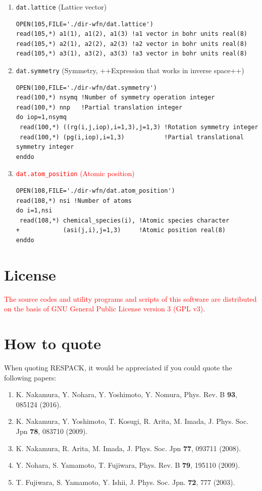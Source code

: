 \documentclass{article}
\newcommand{\tr}[1]{\textcolor{red}{#1}}
\begin{document}
\begin{enumerate}
\begin{verbatim}
\end{verbatim}
\item \verb+dat.lattice+ (Lattice vector)
\begin{verbatim}
OPEN(105,FILE='./dir-wfn/dat.lattice') 
read(105,*) a1(1), a1(2), a1(3) !a1 vector in bohr units real(8)
read(105,*) a2(1), a2(2), a2(3) !a2 vector in bohr units real(8) 
read(105,*) a3(1), a3(2), a3(3) !a3 vector in bohr units real(8) 
\end{verbatim}
\item \verb+dat.symmetry+ (Symmetry, ++Expression that works in inverse space++)
\begin{verbatim}
OPEN(100,FILE='./dir-wfn/dat.symmetry') 
read(100,*) nsymq !Number of symmetry operation integer
read(100,*) nnp   !Partial translation integer
do iop=1,nsymq 
 read(100,*) ((rg(i,j,iop),i=1,3),j=1,3) !Rotation symmetry integer
 read(100,*) (pg(i,iop),i=1,3)           !Partial translational symmetry integer 
enddo 
\end{verbatim}
\item \tr{{\tt dat.atom\_position} (Atomic position)}
\begin{verbatim}
OPEN(108,FILE='./dir-wfn/dat.atom_position')
read(108,*) nsi !Number of atoms
do i=1,nsi
 read(108,*) chemical_species(i), !Atomic species character
+            (asi(j,i),j=1,3)     !Atomic position real(8)
enddo
\end{verbatim}
\end{enumerate}

\clearpage 

\section{\label{license}License} 

\tr{The source codes and utility programs and scripts of this software are distributed on the basis of GNU General Public License version 3 (GPL v3)}.

\section{\label{howtocite}How to quote} 

When quoting RESPACK, it would be appreciated if you could quote the following papers: 
\begin{enumerate} 
\item K. Nakamura, Y. Nohara, Y. Yoshimoto, Y. Nomura, Phys. Rev. B {\bf 93}, 085124 (2016).
\item K. Nakamura, Y. Yoshimoto, T. Kosugi, R. Arita, M. Imada, J. Phys. Soc. Jpn {\bf 78}, 083710 (2009).
\item K. Nakamura, R. Arita, M. Imada, J. Phys. Soc. Jpn {\bf 77}, 093711 (2008).
\item Y. Nohara, S. Yamamoto, T. Fujiwara, Phys. Rev. B {\bf 79}, 195110 (2009).
\item T. Fujiwara, S. Yamamoto, Y. Ishii, J. Phys. Soc. Jpn. {\bf 72}, 777 (2003).
\end{enumerate} 
\end{document}
